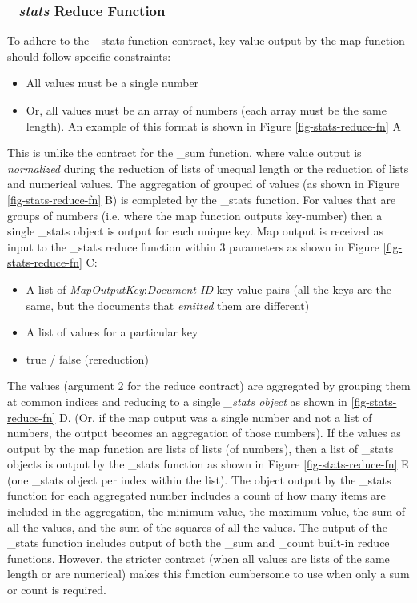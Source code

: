 

\subsubsection{\textit{\_stats} Reduce Function}
To adhere to the \_stats function contract, key-value output by the map function should follow specific constraints:

\begin{itemize}
    \item All values must be a single number
    \item Or, all values must be an array of numbers (each array must be the same length). An example of this format is shown in Figure \ref{fig-stats-reduce-fn} A
\end{itemize}

This is unlike the contract for the \_sum function, where value output is \textit{normalized} during the reduction of lists of unequal length or the reduction of lists and numerical values. The aggregation of grouped of values (as shown in Figure \ref{fig-stats-reduce-fn} B) is completed by the \_stats function. For values that are groups of numbers (i.e. where the map function outputs key-number) then a single \_stats object is output for each unique key. Map output is received as input to the \_stats reduce function within 3 parameters as shown in Figure \ref{fig-stats-reduce-fn} C:

\begin{itemize}
    \item A list of \textit{MapOutputKey}:\textit{Document ID} key-value pairs (all the keys are the same, but the documents that \textit{emitted} them are different)
    \item A list of values for a particular key
    \item true / false (rereduction)
\end{itemize}

The values (argument 2 for the reduce contract) are aggregated by grouping them at common indices and reducing to a single \textit{\_stats object} as shown in \ref{fig-stats-reduce-fn} D. (Or, if the map output was a single number and not a list of numbers, the output becomes an aggregation of those numbers). If the values as output by the map function are lists of lists (of numbers), then a list of \_stats objects is output by the \_stats function as shown in Figure \ref{fig-stats-reduce-fn} E (one \_stats object per index within the list). The object output by the \_stats function for each aggregated number includes a count of how many items are included in the aggregation, the minimum value, the maximum value, the sum of all the values, and the sum of the squares of all the values. The output of the \_stats function includes output of both the \_sum and \_count built-in reduce functions. However, the stricter contract (when all values are lists of the same length or are numerical) makes this function cumbersome to use when only a sum or count is required.

